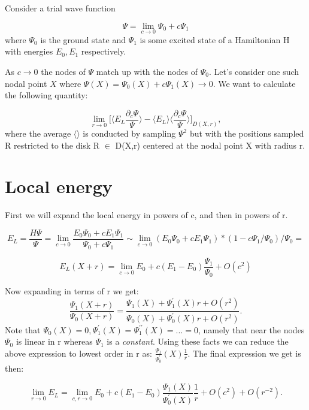 \documentclass{article}
\begin{document}
Consider a trial wave function 

\begin{equation}
\Psi = \lim_{c\rightarrow 0} \Psi_0 + c \Psi_1
\end{equation}
 where $\Psi_0$ is the ground state and $\Psi_1$ is some excited state of a Hamiltonian H with energies $E_0, E_1$ respectively.

As $c \rightarrow 0$ the nodes of $\Psi$ match up with the nodes of $\Psi_0$. Let's consider one such nodal point $X$ where $\Psi(X) = \Psi_0(X) + c\Psi_1(X) \rightarrow 0$. We want to calculate the following quantity:

\begin{equation}
\lim_{r\rightarrow 0} \Bigg[\langle E_L \frac{\partial_c\Psi}{\Psi}\rangle - \langle E_L \rangle \langle\frac{\partial_c\Psi}{\Psi}\rangle \Bigg]_{D(X,r)},
\end{equation}
where the average $\langle \rangle$ is conducted by sampling $\Psi^2$ but with the positions sampled R restricted to the disk R $\in$ D(X,r) centered at the nodal point X with radius r.

\section{Local energy}
First we will expand the local energy in powers of c, and then in powers of r. 

$$E_L = \frac{H\Psi}{\Psi} = \lim_{c\rightarrow 0} \frac{E_0\Psi_0 + cE_1\Psi_1}{\Psi_0 + c\Psi_1} \sim \lim_{c\rightarrow 0}(E_0\Psi_0 + cE_1\Psi_1)*(1-c\Psi_1/\Psi_0)/\Psi_0=$$

$$E_L(X+r) = \lim_{c\rightarrow 0}E_0 + c(E_1 - E_0)\frac{\Psi_1}{\Psi_0} + O(c^2)$$

Now expanding in terms of r we get:
$$\frac{\Psi_1(X+r)}{\Psi_0(X+r)} = \frac{\Psi_1(X) + \Psi_1^\prime(X)r + O(r^2)}{\Psi_0(X) + \Psi_0^\prime(X)r + O(r^2)}.$$
Note that $\Psi_0(X) = 0, \Psi_1^\prime(X)=\Psi_1^{\prime \prime}(X) =...=0$, namely that near the nodes $\Psi_0$ is linear in r whereas $\Psi_1$ is a \textit{constant}. Using these facts we can reduce the above expression to lowest order in r as: $\frac{\Psi_1}{\Psi_0^\prime}(X)\frac{1}{r}$. The final expression we get is then:

\begin{equation}
\boxed{\lim_{r\rightarrow 0} E_L = \lim_{c,r \rightarrow 0} E_0 + c(E_1 - E_0)\frac{\Psi_1(X)}{\Psi_0^\prime(X)}\frac{1}{r} + O(c^2) + O(r^{-2})}.
\end{equation}
\end{document}
